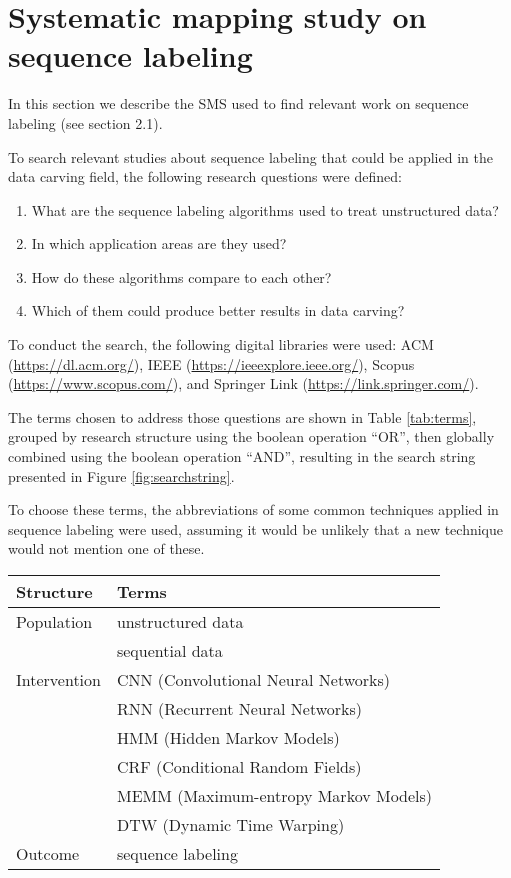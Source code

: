 \section{Systematic mapping study on sequence labeling}
In this section we describe the SMS used to find relevant work on sequence labeling (see section 2.1).

To search relevant studies about sequence labeling that could be applied in the data carving field, the following research questions were defined:

\begin{enumerate}[itemindent=\parindent,label=\textbf{RQ\arabic*.}]
\item   What are the sequence labeling algorithms used to treat unstructured data?
\item   In which application areas are they used?
\item   How do these algorithms compare to each other?
\item   Which of them could produce better results in data carving?
\end{enumerate}

To conduct the search, the following digital libraries were used: ACM (\url{https://dl.acm.org/}), 
IEEE (\url{https://ieeexplore.ieee.org/}),
Scopus (\url{https://www.scopus.com/}),
and
Springer Link (\url{https://link.springer.com/}).

The terms chosen to address those questions are shown in Table \ref{tab:terms}, grouped by research structure using the boolean operation “OR”, then globally combined using the boolean operation “AND”, resulting in the search string presented in  Figure \ref{fig:searchstring}.

To choose these terms, the abbreviations of some common techniques applied in sequence labeling were used, assuming it would be unlikely that a new technique would not mention one of these. 


\begin{table*}[!ht]
    \centering
    \caption{Terms used}
    \label{tab:terms}
    \begin{tabular}{ l  l  }
      Structure 	& Terms 		 \\
      \hline\hline
      Population 	& unstructured data \\   
                    & sequential data \\
      \hline
      Intervention 	& CNN (Convolutional Neural Networks)\\
                    & RNN (Recurrent Neural Networks)\\
                    & HMM (Hidden Markov Models)\\
                    & CRF (Conditional Random Fields)\\
                    & MEMM (Maximum-entropy Markov Models)\\
                    & DTW (Dynamic Time Warping)\\
      \hline
      Outcome 		& sequence labeling \\
      \hline
    \end{tabular}
\end{table*}

